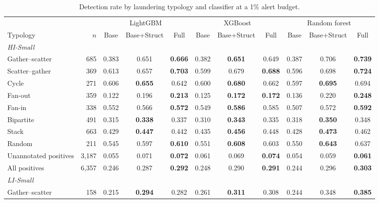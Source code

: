 \begin{table}[htbp]
\centering
\scriptsize
\caption{Detection rate by laundering typology and classifier at a 1\% alert budget.}
\label{tab:patternsapp}
\setlength{\tabcolsep}{3.5pt}
\begin{threeparttable}
\begin{tabular}{lrccccccccc}
\toprule
& & \multicolumn{3}{c}{LightGBM} & \multicolumn{3}{c}{XGBoost} & \multicolumn{3}{c}{Random forest} \\
\cmidrule(lr){3-5}\cmidrule(lr){6-8}\cmidrule(lr){9-11}
Typology & $n$ & Base & Base+Struct & Full & Base & Base+Struct & Full & Base & Base+Struct & Full \\
\midrule
\multicolumn{11}{l}{\textit{HI-Small}} \\
\midrule
Gather--scatter & 685 & 0.383 & 0.651 & \textbf{0.666} & 0.382 & \textbf{0.651} & 0.649 & 0.387 & 0.706 & \textbf{0.739} \\
Scatter--gather & 369 & 0.613 & 0.657 & \textbf{0.703} & 0.599 & 0.679 & \textbf{0.688} & 0.596 & 0.698 & \textbf{0.724} \\
Cycle & 271 & 0.606 & \textbf{0.655} & 0.642 & 0.600 & \textbf{0.680} & 0.662 & 0.597 & \textbf{0.695} & 0.694 \\
Fan-out & 359 & 0.122 & 0.196 & \textbf{0.213} & 0.125 & \textbf{0.172} & \textbf{0.172} & 0.136 & 0.220 & \textbf{0.248} \\
Fan-in & 338 & 0.552 & 0.566 & \textbf{0.572} & 0.549 & \textbf{0.586} & 0.585 & 0.507 & 0.572 & \textbf{0.592} \\
Bipartite & 491 & 0.315 & \textbf{0.338} & 0.337 & 0.310 & \textbf{0.343} & 0.335 & 0.318 & \textbf{0.350} & 0.348 \\
Stack & 663 & 0.429 & \textbf{0.447} & 0.442 & 0.435 & \textbf{0.456} & 0.448 & 0.428 & \textbf{0.473} & 0.462 \\
Random & 211 & 0.545 & 0.597 & \textbf{0.610} & 0.551 & \textbf{0.608} & 0.603 & 0.550 & \textbf{0.643} & 0.637 \\
\midrule
Unannotated positives & 3,187 & 0.055 & 0.071 & \textbf{0.072} & 0.061 & 0.069 & \textbf{0.074} & 0.054 & 0.059 & \textbf{0.061} \\
All positives & 6,357 & 0.246 & 0.287 & \textbf{0.292} & 0.248 & 0.290 & \textbf{0.291} & 0.244 & 0.296 & \textbf{0.303} \\
\midrule
\multicolumn{11}{l}{\textit{LI-Small}} \\
\midrule
Gather--scatter & 158 & 0.215 & \textbf{0.294} & 0.282 & 0.261 & \textbf{0.311} & 0.308 & 0.244 & 0.348 & \textbf{0.385} \\

\end{tabular}
\end{threeparttable}
\end{table}
